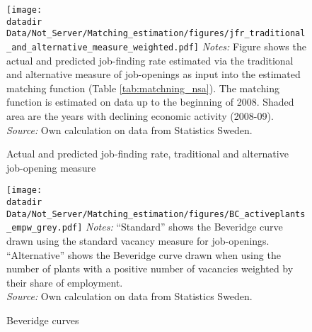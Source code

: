 
\begin{figure}[h]
\centering
\caption{Actual and predicted job-finding rate, traditional and alternative job-opening measure}
\texttt{[image: \\datadir Data/Not\_Server/Matching\_estimation/figures/jfr\_traditional\_and\_alternative\_measure\_weighted.pdf]}
\flushleft
\footnotesize{\emph{Notes:} Figure shows the actual and predicted job-finding rate estimated via the traditional and alternative measure of job-openings as input into the estimated matching function (Table \ref{tab:matchning_nsa}). The matching function is estimated on data up to the beginning of 2008. Shaded area are the years with declining economic activity (2008-09).} \\
\footnotesize{\emph{Source:} Own calculation on data from Statistics Sweden.}
\label{fig:estimated_jfr}
\end{figure}

\begin{figure}[h]
\centering
\caption{Beveridge curves}
\texttt{[image: \\datadir Data/Not\_Server/Matching\_estimation/figures/BC\_activeplants\_empw\_grey.pdf]}
\flushleft
\footnotesize{\emph{Notes:} \enquote{Standard} shows the Beveridge curve drawn using the standard vacancy measure for job-openings. \enquote{Alternative} shows the Beveridge curve drawn when using the number of plants with a positive number of vacancies weighted by their share of employment.} \\
\footnotesize{\emph{Source:} Own calculation on data from Statistics Sweden.}
\label{fig:Beveridge}
\end{figure}

